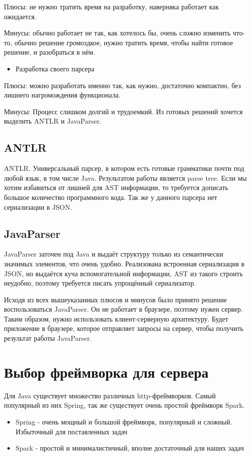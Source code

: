 Плюсы: не нужно тратить время на разработку, наверняка работает как ожидается.

Минусы: обычно работает не так, как хотелось бы, очень сложно изменить что-то, обычно решение громоздкое, нужно тратить время, чтобы найти готовое решение, и разобраться в нём.
\begin{itemize}
\item Разработка своего парсера
\end{itemize}

Плюсы: можно разработать именно так, как нужно, достаточно компактно, без лишнего нагромождения функционала.

Минусы: Процесс слишком долгий и трудоемкий.
Из готовых решений хочется выделить ANTLR и JavaParser.
\subsection{ANTLR} \label{ch2:subsec-title-abbr}
ANTLR. Универсальный парсер, в котором есть готовые грамматики почти под любой язык, в том числе Java. Результатом работы является parse tree. Если мы хотим избавиться от лишней для AST информации, то требуется дописать большое количество программного кода. Так же у данного парсера нет сериализации в JSON.
\subsection{JavaParser} \label{ch2:subsec-title-abbr}
JavaParser заточен под Java и выдаёт структуру только из семантически значимых элементов, что очень удобно. Реализована встроенная сериализация в JSON, но выдаётся куча вспомогательной информации, AST из такого строить неудобно, поэтому требуется писать упрощённый сериализатор.

Исходя из всех вышеуказанных плюсов и минусов было принято решение воспользоваться JavaParser. Он не работает в браузере, поэтому нужен сервер. Таким образом, нужно использовать клиент-серверную архитектуру. Будет приложение в браузере, которое отправляет запросы на сервер, чтобы получить результат работы JavaParser.
\section{Выбор фреймворка для сервера} \label{ch4:sec2}
Для Java существует множество различных http-фреймворков. Самый популярный из них Spring, так же существует очень простой фреймворк Spark.
\begin{itemize}
\item Spring - очень мощный и большой фреймворк, популярный и сложный. Избыточный для поставленных задач
\item Spark - простой и минималистичный, вполне достаточный для наших задач
\end{itemize}
